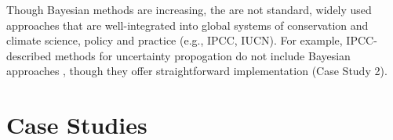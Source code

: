 \documentclass{article}
\begin{document}
\par  Though Bayesian methods are increasing, the are not standard, widely used approaches that are well-integrated into global systems of conservation and climate science, policy and practice (e.g., IPCC, IUCN). For example, IPCC-described methods for uncertainty propogation do not include Bayesian approaches \citep{ipcc2007}, though they offer straightforward implementation (Case Study 2).
\section* {Case Studies}
\end{document}
